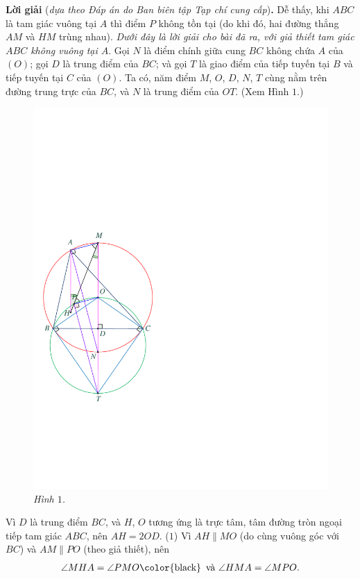 \begin{multicols}{2}
	\vskip 0.05cm
	\textbf{\color{thachthuctoanhoc}Lời giải} (\textit{dựa theo Đáp án do Ban biên tập Tạp chí cung cấp})\textbf{\color{thachthuctoanhoc}.}
	\vskip 0.05cm
	Dễ thấy, khi $ABC$ là tam giác vuông tại $A$ thì điểm $P$ không tồn tại (do khi đó, hai đường thẳng $AM$ và $HM$ trùng nhau). \textit{Dưới đây là lời giải cho bài đã ra, với giả thiết tam giác $ABC$ không vuông tại $A$}.
	\vskip 0.05cm
	Gọi $N$ là điểm chính giữa cung $BC$ không chứa $A$ của $(O)$; gọi $D$ là trung điểm của $BC$; và gọi $T$ là giao điểm của tiếp tuyến tại $B$ và tiếp tuyến tại $C$ của $(O)$. Ta có, năm điểm $M$, $O$, $D$, $N$, $T$ cùng nằm trên đường trung trực của $BC$, và $N$ là trung điểm của $OT$. (Xem Hình $1$.)
	\begin{figure}[H]
		\centering
		\vspace*{-10pt}
		\captionsetup{labelformat= empty, justification=centering}
		\includegraphics[width=0.68\linewidth]{P619H1}
		\caption{\small\textit{\color{thachthuctoanhoc}Hình $1$.}}
		\vspace*{-10pt}
	\end{figure}
	Vì $D$ là trung điểm $BC$, và $H$, $O$ tương ứng là trực tâm, tâm đường tròn ngoại tiếp tam giác $ABC$, nên $AH = 2OD$. \hfill ($1$)
	\vskip 0.05cm
	Vì $AH \parallel MO$ (do cùng vuông góc với $BC$) và $AM \parallel PO$ (theo giả thiết), nên
	\begin{align*}
		\angle MHA = \angle PMO \text{\color{black}\, và } \angle HMA = \angle MPO.
	\end{align*}

\end{multicols}
